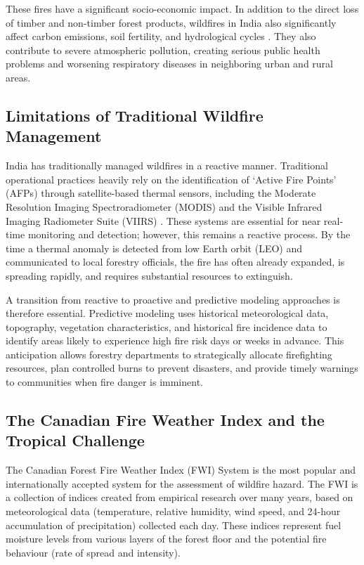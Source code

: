 \documentclass[journal, 10pt, twocolumn]{IEEEtran}
\begin{document}
These fires have a significant socio-economic impact. In addition to the direct loss of timber and non-timber forest products, wildfires in India also significantly affect carbon emissions, soil fertility, and hydrological cycles \cite{b5}. They also contribute to severe atmospheric pollution, creating serious public health problems and worsening respiratory diseases in neighboring urban and rural areas.

\subsection{Limitations of Traditional Wildfire Management}
India has traditionally managed wildfires in a reactive manner. Traditional operational practices heavily rely on the identification of `Active Fire Points' (AFPs) through satellite-based thermal sensors, including the Moderate Resolution Imaging Spectroradiometer (MODIS) and the Visible Infrared Imaging Radiometer Suite (VIIRS) \cite{b6}. These systems are essential for near real-time monitoring and detection; however, this remains a reactive process. By the time a thermal anomaly is detected from low Earth orbit (LEO) and communicated to local forestry officials, the fire has often already expanded, is spreading rapidly, and requires substantial resources to extinguish.

A transition from reactive to proactive and predictive modeling approaches is therefore essential. Predictive modeling uses historical meteorological data, topography, vegetation characteristics, and historical fire incidence data to identify areas likely to experience high fire risk days or weeks in advance. This anticipation allows forestry departments to strategically allocate firefighting resources, plan controlled burns to prevent disasters, and provide timely warnings to communities when fire danger is imminent.

\subsection{The Canadian Fire Weather Index and the Tropical Challenge}
The Canadian Forest Fire Weather Index (FWI) System \cite{b8} is the most popular and internationally accepted system for the assessment of wildfire hazard. The FWI is a collection of indices created from empirical research over many years, based on meteorological data (temperature, relative humidity, wind speed, and 24-hour accumulation of precipitation) collected each day. These indices represent fuel moisture levels from various layers of the forest floor and the potential fire behaviour (rate of spread and intensity).
\end{document}
